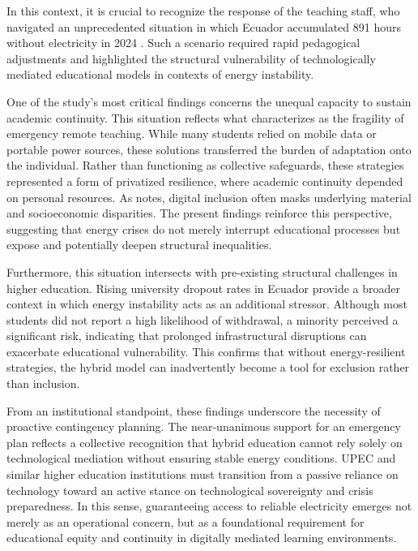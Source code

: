 \documentclass[english]{textolivre}
\begin{document}
In this context, it is crucial to recognize the response of the teaching staff, who navigated an unprecedented situation in which Ecuador accumulated 891 hours without electricity in 2024 \cite{eluniverso2024sinluz}. Such a scenario required rapid pedagogical adjustments and highlighted the structural vulnerability of technologically mediated educational models in contexts of energy instability.

One of the study’s most critical findings concerns the unequal capacity to sustain academic continuity. This situation reflects what \textcite{behar2020ensino} characterizes as the fragility of emergency remote teaching. While many students relied on mobile data or portable power sources, these solutions transferred the burden of adaptation onto the individual. Rather than functioning as collective safeguards, these strategies represented a form of privatized resilience, where academic continuity depended on personal resources. As \textcite{selwyn2017educacao} notes, digital inclusion often masks underlying material and socioeconomic disparities. The present findings reinforce this perspective, suggesting that energy crises do not merely interrupt educational processes but expose and potentially deepen structural inequalities.

Furthermore, this situation intersects with pre-existing structural challenges in higher education. Rising university dropout rates in Ecuador \cite{delgado2024desercion} provide a broader context in which energy instability acts as an additional stressor. Although most students did not report a high likelihood of withdrawal, a minority perceived a significant risk, indicating that prolonged infrastructural disruptions can exacerbate educational vulnerability. This confirms that without energy-resilient strategies, the hybrid model can inadvertently become a tool for exclusion rather than inclusion.

From an institutional standpoint, these findings underscore the necessity of proactive contingency planning. The near-unanimous support for an emergency plan reflects a collective recognition that hybrid education cannot rely solely on technological mediation without ensuring stable energy conditions. UPEC and similar higher education institutions must transition from a passive reliance on technology toward an active stance on technological sovereignty and crisis preparedness. In this sense, guaranteeing access to reliable electricity emerges not merely as an operational concern, but as a foundational requirement for educational equity and continuity in digitally mediated learning environments.
\end{document}
